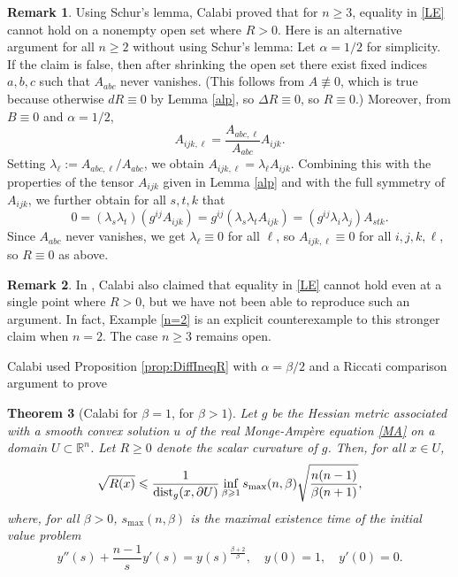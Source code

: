 \documentclass[11pt,reqno]{amsart}
\renewcommand{\leq}{\leqslant}
\renewcommand{\geq}{\geqslant}
\theoremstyle{plain}
\newtheorem{theorem}{Theorem}[section]
\theoremstyle{definition}
\newtheorem{remark}[theorem]{Remark}
\numberwithin{equation}{section}
\begin{document}
\begin{remark}\label{Sharp1}
Using Schur's lemma, Calabi \cite[p.~114]{EC} proved that for $n \geq 3$, equality in \eqref{LE} cannot hold on a nonempty open set where $R > 0$. Here is an alternative argument for all $n \geq 2$ without using Schur's lemma: Let $\alpha=1/2$ for simplicity. If the claim is false, then after shrinking the open set there exist fixed indices $a,b,c$ such that $A_{abc}$ never vanishes. (This follows from $A \not \equiv 0$, which is true because otherwise $dR \equiv 0$ by Lemma \ref{alp}, so $\Delta R \equiv 0$, so $R \equiv 0$.) Moreover, from $B \equiv 0$ and $\alpha = 1/2$,
$$A_{ijk,\ell}=\frac{A_{abc,\ell}}{A_{abc}}A_{ijk}.$$
Setting $\lambda_{\ell}:=A_{abc,\ell}/A_{abc}$, we obtain $A_{ijk,\ell}=\lambda_{\ell}A_{ijk}$. Combining this with the properties of the tensor $A_{ijk}$ given in Lemma \ref{alp} and with the full symmetry of $A_{ijk}$, we further obtain for all $s,t,k$ that
$$0
 = (\lambda_{s}\lambda_{t})(g^{ij}A_{ijk})
 = g^{ij} (\lambda_{s}\lambda_{t} A_{ijk})
 = (g^{ij} \lambda_{i}\lambda_{j}) A_{stk}.
$$
Since $A_{abc}$ never vanishes, we get $\lambda_\ell \equiv 0$ for all $\ell$, so $A_{ijk,\ell} \equiv 0$ for all $i,j,k,\ell$, so $R \equiv 0$ as above.
\end{remark}

\begin{remark}
    In \cite[p.~114]{EC}, Calabi also claimed that equality in \eqref{LE} cannot hold even at a single point where $R > 0$, but we have not been able to reproduce such an argument. In fact, Example \ref{n=2} is an explicit counterexample to this stronger claim when $n=2$. The case $n \geq 3$ remains open.
\end{remark}

Calabi used Proposition \ref{prop:DiffIneqR} with $\alpha = \beta/2$ and a Riccati comparison argument to prove

\begin{theorem}[Calabi {\cite[Eq. 1.19 and bottom of p. 120]{EC}} for $\beta=1$, {\cite[Thm 2.2.13]{JSAR}} for $\beta>1$]\label{T11}
    Let $g$ be the Hessian metric associated with a smooth convex solution $u$ of the real Monge-Ampère equation
\eqref{MA} on a domain $U \subset \mathbb{R}^n$. Let $R \geq 0$ denote the scalar curvature of $g$. Then, for all $x \in U$,
$$\sqrt{R(x)}\leq \frac{1}{{\rm dist}_g(x,\partial U)}\inf_{\beta \geq 1}  s_{\max}(n,\beta)\sqrt{\frac{n(n-1)}{\beta(n+1)}},$$
where, for all $\beta > 0$, $s_{\max}(n,\beta)$ is the maximal existence time of the initial value problem
 \begin{equation}\label{ODE}
y''(s)+\frac{n-1}{s}y'(s)=y(s)^{\frac{\beta+2}{\beta}}, \quad y(0)=1,\quad  y'(0)=0.
\end{equation}
\end{theorem}
\end{document}
